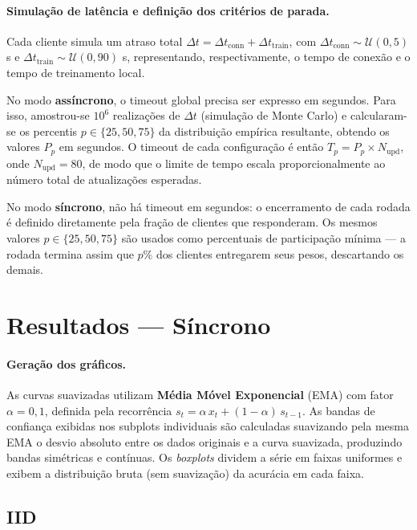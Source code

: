 \documentclass[12pt, a4paper]{article}
\begin{document}
\paragraph{Simulação de latência e definição dos critérios de parada.}
Cada cliente simula um atraso total
$\Delta t = \Delta t_{\text{conn}} + \Delta t_{\text{train}}$,
com $\Delta t_{\text{conn}} \sim \mathcal{U}(0, 5)$ s e
$\Delta t_{\text{train}} \sim \mathcal{U}(0, 90)$ s,
representando, respectivamente, o tempo de conexão e o tempo de treinamento local.

No modo \textbf{assíncrono}, o timeout global precisa ser expresso em segundos.
Para isso, amostrou-se $10^6$ realizações de $\Delta t$ (simulação de Monte Carlo)
e calcularam-se os percentis $p \in \{25, 50, 75\}$ da distribuição empírica resultante,
obtendo os valores $P_p$ em segundos.
O timeout de cada configuração é então $T_p = P_p \times N_{\text{upd}}$,
onde $N_{\text{upd}} = 80$, de modo que o limite de tempo escala proporcionalmente
ao número total de atualizações esperadas.

No modo \textbf{síncrono}, não há timeout em segundos: o encerramento de cada rodada
é definido diretamente pela fração de clientes que responderam.
Os mesmos valores $p \in \{25, 50, 75\}$ são usados como percentuais de participação
mínima — a rodada termina assim que $p\%$ dos clientes entregarem seus pesos,
descartando os demais.

\section{Resultados — Síncrono}

\paragraph{Geração dos gráficos.}
As curvas suavizadas utilizam \textbf{Média Móvel Exponencial} (EMA) com fator
$\alpha = 0{,}1$, definida pela recorrência $s_t = \alpha\, x_t + (1-\alpha)\, s_{t-1}$.
As bandas de confiança exibidas nos subplots
individuais são calculadas suavizando pela mesma EMA o desvio absoluto entre os dados
originais e a curva suavizada, produzindo bandas simétricas e contínuas.
Os \textit{boxplots} dividem a série em faixas uniformes e exibem a distribuição
bruta (sem suavização) da acurácia em cada faixa.

\subsection*{IID}
\end{document}

